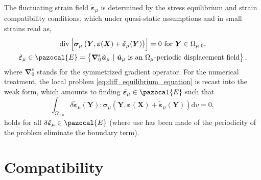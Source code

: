 The fluctuating strain field \(\tilde{\bm\varepsilon}_\mu\) is determined by the stress equilibrium and strain compatibility conditions, which under quasi-static assumptions and in small strains read as,
\begin{gather}\label{eq:diff_equilibrium_equation}
\operatorname{div}\left[\bm{\sigma}_\mu\left(\bm Y, \bm \varepsilon(\bm X)+\tilde{\bm\varepsilon}_\mu(\bm Y)\right)\right]=0 \text { for } \bm Y \in \Omega_{\mu,0},\\
\label{eq:compatibility_equations}
\tilde{\bm\varepsilon}_\mu \in \pazocal{E}=\left\{\bm{\nabla}_0^{\mathrm{s}} \tilde{\bm{u}}_\mu\ |\ \text{\(\tilde{\bm{u}}_\mu\) is an \(\Omega_\mu\)-periodic displacement field}\right\},
\end{gather}
where \(\bm{\nabla}_0^{\mathrm{s}}\) stands for the symmetrized gradient operator.
For the numerical treatment, the local problem \eqref{eq:diff_equilibrium_equation} is recast into the weak form, which amounts to finding \(\tilde{\bm\varepsilon}_\mu \in \pazocal{E}\) such that
\begin{equation} \label{eq:weak_form_equilibrium_eq}
\int_{\Omega_{\mu,0}} \delta \tilde{\bm\varepsilon}_\mu(\bm{Y}): \bm{\sigma}_\mu\left(\bm Y, \bm \varepsilon(\bm X)+\tilde{\bm\varepsilon}_\mu(\bm Y)\right) \mathrm{d}v = 0,
\end{equation}
holds for all \(\delta \tilde{\bm\varepsilon}_\mu \in \pazocal{E}\) (where use has been made of the periodicity of the problem eliminate the boundary term).

\section{Compatibility} \label{sec:compatibility}

